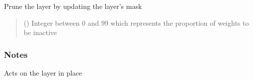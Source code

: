\documentclass[letterpaper,10pt,english]{sphinxmanual}
\begin{document}
\begin{fulllineitems}
\begin{fulllineitems}
\label{\detokenize{beyondml.pt.layers:beyondml.pt.layers.MaskedConv2D.MaskedConv2D.in_channels}}
\pysigstartsignatures
{}
\pysigstopsignatures
\end{fulllineitems}


\begin{fulllineitems}
\label{\detokenize{beyondml.pt.layers:beyondml.pt.layers.MaskedConv2D.MaskedConv2D.kernel_size}}
\pysigstartsignatures
{}
\pysigstopsignatures
\end{fulllineitems}


\begin{fulllineitems}
\label{\detokenize{beyondml.pt.layers:beyondml.pt.layers.MaskedConv2D.MaskedConv2D.out_channels}}
\pysigstartsignatures
{}
\pysigstopsignatures
\end{fulllineitems}


\begin{fulllineitems}
\label{\detokenize{beyondml.pt.layers:beyondml.pt.layers.MaskedConv2D.MaskedConv2D.prune}}
\pysigstartsignatures
{}
\pysigstopsignatures
\sphinxAtStartPar
Prune the layer by updating the layer’s mask
\begin{quote}\begin{description}
\sphinxAtStartPar
{} () \textendash{} Integer between 0 and 99 which represents the proportion of weights to be inactive

\end{description}\end{quote}
\subsubsection*{Notes}

\sphinxAtStartPar
Acts on the layer in place

\end{fulllineitems}


\end{fulllineitems}
\end{document}
